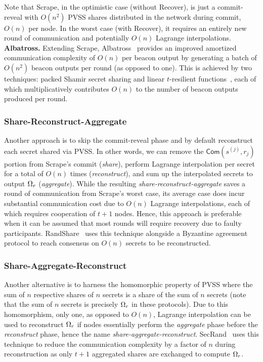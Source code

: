 Note that Scrape, in the optimistic case (without Recover), is just a commit-reveal with $O(n^2)$ PVSS shares distributed in the network during commit, $O(n)$ per node. In the worst case (with Recover), it requires an entirely new round of communication and potentially $O(n)$ Lagrange interpolations.\\

\noindent\textbf{Albatross.} Extending Scrape, Albatross~\cite{cascudo2020albatross} provides an improved amortized communication complexity of $O(n)$ per beacon output by generating a batch of $O(n^2)$ beacon outputs per round (as opposed to one). This is achieved by two techniques: packed Shamir secret sharing and linear $t$-resilient functions~\cite{cascudo2020albatross}, each of which multiplicatively contributes $O(n)$ to the number of beacon outputs produced per round.

\subsubsection{Share-Reconstruct-Aggregate}
Another approach is to skip the commit-reveal phase and by default reconstruct each secret shared via PVSS. In other words, we can remove the $\mathsf{Com}(s^{(j)}, r_j)$ portion from Scrape's commit (\textit{share}), perform Lagrange interpolation per secret for a total of $O(n)$ times (\textit{reconstruct}), and sum up the interpolated secrets to output $\Omega_r$ (\textit{aggregate}). While the resulting \textit{share-reconstruct-aggregate} saves a round of communication from Scrape's worst case, its average case does incur substantial communication cost due to $O(n)$ Lagrange interpolations, each of which requires cooperation of $t + 1$ nodes. Hence, this approach is preferable when it can be assumed that most rounds will require recovery due to faulty participants. RandShare~\cite{syta2017scalable} uses this technique alongside a Byzantine agreement protocol to reach consensus on $O(n)$ secrets to be reconstructed.

\subsubsection{Share-Aggregate-Reconstruct}
Another alternative is to harness the homomorphic property of PVSS where the sum of $n$ respective shares of $n$ secrets is a share of the sum of $n$ secrets (note that the sum of $n$ secrets is precisely $\Omega_r$ in these protocols). Due to this homomorphism, only one, as opposed to $O(n)$, Lagrange interpolation can be used to reconstruct $\Omega_r$ if nodes essentially perform the \textit{aggregate} phase before the \textit{reconstruct} phase, hence the name \textit{share-aggregate-reconstruct}. SecRand~\cite{guo2020secRand} uses this technique to reduce the communication complexity by a factor of $n$ during reconstruction as only $t + 1$ aggregated shares are exchanged to compute $\Omega_r$.

